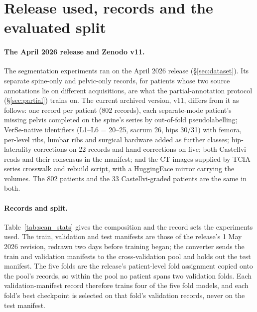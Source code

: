 \section{Release used, records and the evaluated split}
\label{app:release}

\paragraph{The April 2026 release and Zenodo v11.}
The segmentation experiments ran on the April 2026 release
(\S\ref{sec:dataset}). Its separate spine-only and
pelvic-only records, for patients whose two source
annotations lie on different acquisitions, are what the
partial-annotation protocol (\S\ref{sec:partial}) trains
on. The current archived version, v11, differs from it as
follows: one record per patient (802 records), each
separate-mode patient's missing pelvis completed on the
spine's series by out-of-fold pseudolabelling; VerSe-native
identifiers (L1--L6 = 20--25, sacrum 26, hips 30/31) with
femora, per-level ribs, lumbar ribs and surgical hardware
added as further classes; hip-laterality corrections on 22
records and hand corrections on five; both Castellvi reads
and their consensus in the manifest; and the CT images
supplied by TCIA series crosswalk and rebuild script, with
a HuggingFace mirror carrying the volumes. The 802 patients
and the 33 Castellvi-graded patients are the same in both.

\paragraph{Records and split.}
\label{app:split}
Table~\ref{tab:scan_stats} gives the composition and the
record sets the experiments used. The train, validation
and test manifests are those of the release's 1 May 2026
revision, redrawn two days before training began; the
converter sends the train and validation manifests to the
cross-validation pool and holds out the test manifest.
The five folds are the release's patient-level fold
assignment copied onto the pool's records, so within the
pool no patient spans two validation folds. Each
validation-manifest record therefore trains four of the
five fold models, and each fold's best checkpoint is
selected on that fold's validation records, never on the
test manifest.


